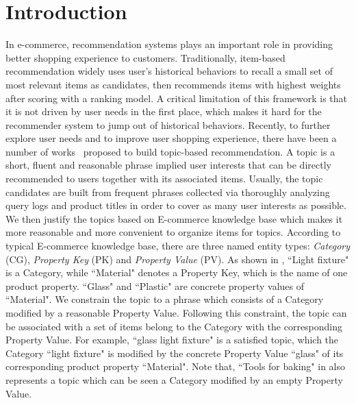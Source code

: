 \section{Introduction}
\label{sec:introduction}
In e-commerce, recommendation systems plays an important role in providing better shopping experience to customers. 
Traditionally, item-based recommendation widely uses user's historical behaviors to recall a small set of most relevant items as candidates, then recommends items with highest weights after scoring with a ranking model. 
A critical limitation of this framework is that it is not driven by user needs in the first place,
which makes it hard for the recommender system to jump out of historical behaviors.
Recently, to further explore user needs and to improve user shopping experience, 
there have been a number of works~\cite{luo2019conceptualize} proposed to build topic-based recommendation.
A topic is a short, fluent and reasonable phrase implied user interests
that can be directly recommended to users  together with its associated items.
Usually, the topic candidates are built from frequent phrases collected via 
thoroughly analyzing query logs and product titles in order to cover as many user interests as possible.
We then justify the topics based on E-commerce knowledge base
which makes it more reasonable and more convenient to organize items for topics.  
According to typical E-commerce knowledge base,
there are three named entity types:
\emph{Category} (CG), \emph{Property Key} (PK) and \emph{Property Value} (PV).
As shown in ,
``Light fixture" is a Category, 
while ``Material" denotes a Property Key, which is the name of one product property.
``Glass"  and ``Plastic" are concrete property values of ``Material".
We constrain the topic to a phrase which consists of a Category modified by a reasonable Property Value.
Following this constraint, the topic can be associated with 
a set of items belong to the Category with the corresponding Property Value.
For example, ``glass light fixture" is a satisfied topic,
which the Category ``light fixture" is modified
by the concrete Property Value ``glass" of its 
corresponding product property ``Material".
Note that, ``Tools for baking" in 
also represents a topic which can be seen a Category modified by an empty Property Value.  
